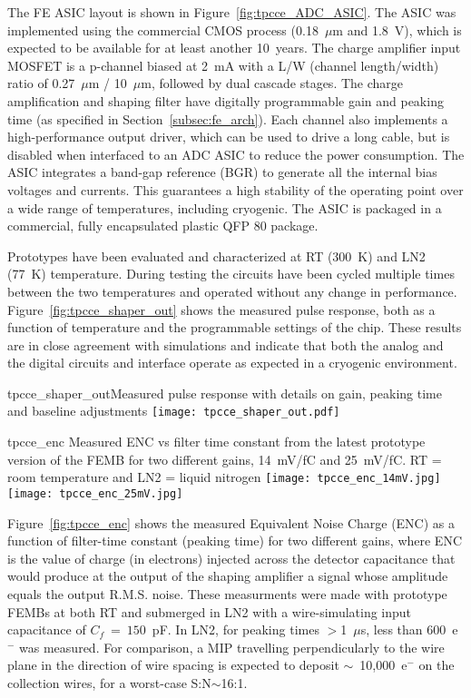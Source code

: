 The FE ASIC layout is shown in Figure~\ref{fig:tpcce_ADC_ASIC}.
The ASIC was implemented using the commercial CMOS process (0.18~$\mu$m and 1.8~V), which 
is expected to be available for at least another 10~years. 
The charge amplifier input MOSFET is a p-channel biased at 2~mA with a L/W (channel length/width) ratio
of 0.27~$\mu$m / 10~$\mu$m, followed by dual cascade stages.
The charge amplification and shaping filter have digitally programmable gain and peaking time
(as specified in Section~\ref{subsec:fe_arch}).
Each channel also implements a high-performance output driver,
which can be used to drive a long cable, but is disabled when interfaced to an ADC ASIC to reduce the power consumption.
The ASIC integrates a band-gap reference (BGR) to generate all the internal bias voltages and currents.
This guarantees a high stability of the operating point over a wide range of
temperatures, including cryogenic.
The ASIC is packaged in a commercial, fully encapsulated plastic QFP 80 package.

Prototypes have been evaluated and characterized at RT (300~K) and LN2 (77~K) temperature.
During testing the circuits have been cycled multiple times
between the two temperatures and operated without any change in performance.
Figure~\ref{fig:tpcce_shaper_out} shows the measured pulse response, both as a function
of temperature and the programmable settings of the chip.
These results are in close agreement with simulations and indicate
that both the analog and the digital circuits and interface operate as
expected in a cryogenic environment.

\begin{cdrfigure}{tpcce_shaper_out}{Measured pulse response with
 details on gain, peaking time and baseline adjustments}
\texttt{[image: tpcce\_shaper\_out.pdf]}
\end{cdrfigure}

\begin{cdrfigure}{tpcce_enc}{
Measured ENC vs filter time constant from the latest prototype version of the FEMB
for two different gains, 14~mV/fC and 25~mV/fC. RT = room temperature and 
LN2 = liquid nitrogen}
\texttt{[image: tpcce\_enc\_14mV.jpg]}
\texttt{[image: tpcce\_enc\_25mV.jpg]}
\end{cdrfigure}

Figure~\ref{fig:tpcce_enc} shows the measured Equivalent Noise Charge (ENC) as a function of 
filter-time constant (peaking time) for two different gains, where ENC is the value of charge 
(in electrons) injected across the detector capacitance that would produce at the output of the 
shaping amplifier a signal whose amplitude equals the output R.M.S. noise. These measurments
were made with prototype FEMBs at both RT and submerged in LN2 with a wire-simulating input capacitance of $C_f~=~150$~pF.
In LN2, for peaking times $>$1~$\mu$s, less than 600~e$^{-}$ was measured. For comparison,
a MIP travelling perpendicularly to the wire plane in the direction of wire spacing is
expected to deposit $\sim$~10,000~e$^{-}$ on the collection wires, for a worst-case
S:N$\sim$16:1.

